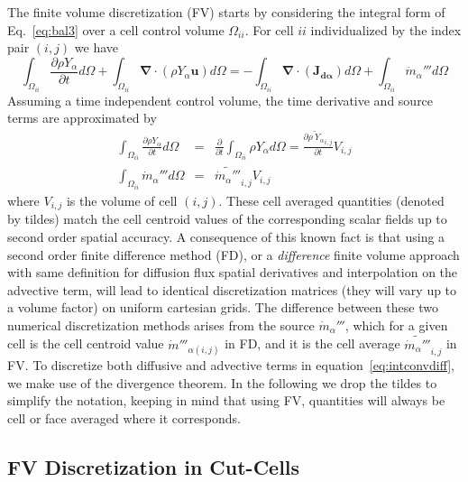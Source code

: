The finite volume discretization (FV) starts by considering the integral form of Eq.~\eqref{eq:bal3} over a cell control volume $\Omega_{ii}$. For
cell $ii$ individualized by the index pair $(i,j)$ we have
%
\begin{equation}
 \int_{\Omega_{ii}} {\frac{\partial \rho Y_\alpha}{\partial t}} d \Omega + \int_{\Omega_{ii}} { \boldsymbol{\nabla} \cdot  \left(  \rho Y_\alpha \mathbf{u} \right)
      } d \Omega  = -\int_{\Omega_{ii}} { \boldsymbol{\nabla} \cdot \left(  \mathbf{J_{d \alpha}}  \right)  } d \Omega + \int_{\Omega_{ii}} { \dot{m}_\alpha''' } d \Omega \label{eq:intconvdiff}
\end{equation}
%
Assuming a time independent control volume, the time derivative and source terms are approximated by
%
\begin{eqnarray}
  \int_{\Omega_{ii}} {\frac{\partial \rho Y_\alpha}{\partial t}} d \Omega & = & \frac{\partial}{\partial t} \int_{\Omega_{ii}} {\rho Y_\alpha} d \Omega
  = \frac{\partial \widetilde{\rho \: Y_\alpha }_{i,j}}{\partial t} V_{i,j} \\
  \int_{\Omega_{ii}} { \dot{m}_\alpha''' } d \Omega & = & \widetilde{ \dot{m}_\alpha''' }_{i,j} V_{i,j} \label{eq:intcons}
\end{eqnarray}
%
where $V_{i,j}$ is the volume of cell $(i,j)$. These cell averaged quantities (denoted by tildes) match the cell centroid values of the corresponding scalar fields up to second order spatial accuracy. A consequence of this known fact is that using a second order finite difference method (FD), or a \textit{difference} finite volume approach with same definition
 for diffusion flux spatial derivatives and interpolation on the advective term, will lead to identical discretization matrices (they will vary up to a volume factor) on uniform cartesian grids. The difference between these two numerical discretization methods arises from the source $\dot{m}_\alpha''' $, which for a given cell is the cell centroid value $\dot{m}'''_{\alpha (i,j)}$ in FD, and it is the cell average $ \widetilde{ \dot{m}_\alpha''' }_{i,j}$ in FV. To discretize both diffusive and advective terms in equation~\eqref{eq:intconvdiff}, we make use of the divergence theorem. In the following we drop the tildes to simplify the notation, keeping in mind that using FV, quantities will always be cell or face averaged where it corresponds.


\subsection{FV Discretization in Cut-Cells} \label{sec:cc}

